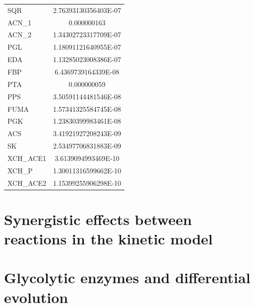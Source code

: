 \documentclass[parskip=full]{scrreprt}
\begin{document}
\begin{longtable}{lS}
SQR & 2.76393130356403E-07\\
ACN\_1 & 0.000000163\\
ACN\_2 & 1.34302723317709E-07\\
PGL & 1.18091121640955E-07\\
EDA & 1.13285023008386E-07\\
FBP & 6.4369739164339E-08\\
PTA & 0.000000059\\
PPS & 3.50591144481546E-08\\
FUMA & 1.57341325584745E-08\\
PGK & 1.23830399983461E-08\\
ACS & 3.41921927208243E-09\\
SK & 2.53497706831883E-09\\
XCH\_ACE1 & 3.6139094993469E-10\\
XCH\_P & 1.30011316599662E-10\\
XCH\_ACE2 & 1.15399255906298E-10\\
\bottomrule
\end{longtable}

\section{Synergistic effects between reactions in the kinetic model}
\label{ap:synergistic}

\section{Glycolytic enzymes and differential evolution}
\label{ap:glycolytic}

\printbibliography
\end{document}
